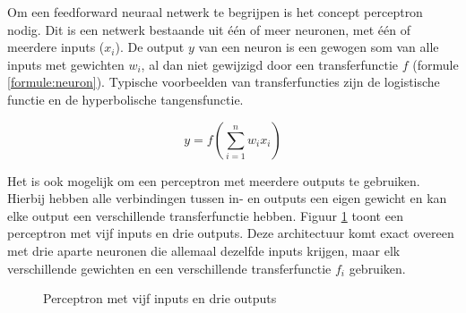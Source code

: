 Om een feedforward neuraal netwerk te begrijpen is het concept perceptron nodig. Dit is een netwerk bestaande uit \'e\'en of meer neuronen, met \'e\'en of meerdere inputs ($x_i$). De output $y$ van een neuron is een gewogen som van alle inputs met gewichten $w_i$, al dan niet gewijzigd door een transferfunctie $f$ (formule \eqref{formule:neuron}). Typische voorbeelden van transferfuncties zijn de logistische functie en de hyperbolische tangensfunctie.

\begin{equation}
    y = f(\sum\limits_{i=1}^{n}w_i x_i)
    \label{formule:neuron}
\end{equation}

Het is ook mogelijk om een perceptron met meerdere outputs te gebruiken. Hierbij hebben alle verbindingen tussen in- en outputs een eigen gewicht en kan elke output een verschillende transferfunctie hebben. Figuur \ref{fig:perceptron} toont een perceptron met vijf inputs en drie outputs. Deze architectuur komt exact overeen met drie aparte neuronen die allemaal dezelfde inputs krijgen, maar elk verschillende gewichten en een verschillende transferfunctie $f_i$ gebruiken.

\begin{figure}[ht]
\def\layersep{2.5cm}
\centering
{}
\caption{Perceptron met vijf inputs en drie outputs}
\label{fig:perceptron}
\end{figure}


